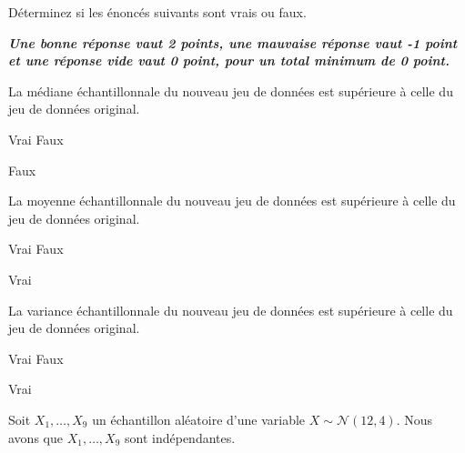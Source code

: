 \begin{questions}
\begin{parts}
Déterminez si les énoncés suivants sont vrais ou faux. 

\textbf{\textit{Une bonne réponse vaut 2 points, une mauvaise réponse vaut -1 point et une réponse vide vaut 0 point, pour un total minimum de 0 point.}}

\begin{subparts}
\subpart La médiane échantillonnale du nouveau jeu de données est supérieure à celle du jeu de données original.

    \begin{oneparcheckboxes}
        \choice Vrai
        \correctchoice Faux
    \end{oneparcheckboxes}
    
\begin{solution}
    Faux
\end{solution}

\subpart La moyenne échantillonnale du nouveau jeu de données est supérieure à celle du jeu de données original.

    \begin{oneparcheckboxes}
        \correctchoice Vrai
        \choice Faux
    \end{oneparcheckboxes}
    
\begin{solution}
    Vrai
\end{solution}

\subpart La variance échantillonnale du nouveau jeu de données est supérieure à celle du jeu de données original.

    \begin{oneparcheckboxes}
        \correctchoice Vrai
        \choice Faux
    \end{oneparcheckboxes}
    
\begin{solution}
    Vrai
\end{solution}

\end{subparts}
\end{parts}

\newpage
\question\label{estimateursPonctuels} 

Soit $X_1, \hdots, X_9$ un échantillon aléatoire d'une variable $X\sim\mathcal{N}(12, 4)$. Nous avons que $X_1, \dots, X_9$ sont indépendantes. 

\end{questions}
